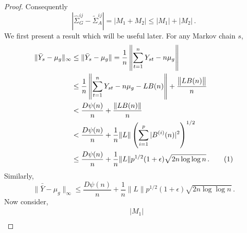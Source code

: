 \documentclass[11pt]{article}
\newcommand\numberthis{\addtocounter{equation}{1}\tag{\theequation}}
\theoremstyle{remark}
\begin{document}
\begin{proof}
Consequently
\[
\left|\hat{\Sigma}_{G}^{ij} - \tilde{\Sigma}_{A}^{ij}  \right| = |M_1 + M_2| \leq |M_1| + |M_2|\,.
\]
%
We first present a result which will be useful later. For any Markov chain $s$, 
\begin{align*}
  \|\bar{Y}_s - \mu_g\|_{\infty} & \leq \|\bar{Y}_s - \mu_g\| = \dfrac{1}{n}\left\|\sum_{t=1}^{n}Y_{st} - n\mu_g\right\| \\
  & \leq \dfrac{1}{n}\left\|\sum_{t=1}^{n}Y_{st} - n \mu_g - L B(n)\right\| + \dfrac{\left\|L B(n)\right\|}{n}\\
  &< \dfrac{D\psi(n)}{n} + \dfrac{\|L B(n)\|}{n}\\
  &< \dfrac{D\psi(n)}{n} + \dfrac{1}{n}\|L\| \left(\sum\limits_{i=1}^{p}|B^{(i)}(n)|^2\right)^{1/2}\\
  & \leq \dfrac{D\psi(n)}{n} + \dfrac{1}{n}\|L\| p^{1/2}(1+\epsilon)\sqrt{2n \log\log n}\,. \numberthis \label{eq:xbars_bound}
\end{align*}
 Similarly,
 \begin{equation}
\label{eq:xbarbar_bound}
   \| \bar{\bar{Y}} - \mu_g\|_{\infty} \leq \dfrac{D\psi(n)}{n} + \dfrac{1}{n}\|L\| p^{1/2}(1+\epsilon)\sqrt{2n \log\log n}\,.
\end{equation}
%
Now consider,
\begin{align*}
& |M_1| \\ 

\end{align*}
\end{proof}
\end{document}
